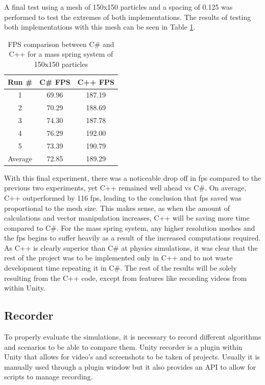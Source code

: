\documentclass[12pt,a4paper]{article}
\begin{document}
A final test using a mesh of 150x150 particles and a spacing of 0.125 was performed to test the extremes of both implementations. The results of testing both implementations with this mesh can be seen in Table \ref{tab:lang3}.\\
\begin{table}[htbp]
	\centering
	\begin{tabular}{|c|c|c|} %
		\hline %
		Run \# & C\# FPS & C++ FPS \\ %
		\hline %
		1 & 69.96 & 187.19 \\ 
		2 & 70.29 & 188.69 \\ 
		3 & 74.30 & 187.78 \\ 
		4 & 76.29 & 192.00  \\ 
		5 & 73.39 & 190.79  \\ 
		\hline
		Average & 72.85 & 189.29 \\ 
		\hline %
	\end{tabular}
	\caption{FPS comparison between C\# and C++ for a mass spring system of 150x150 particles} %
	\label{tab:lang3}
\end{table}

With this final experiment, there was a noticeable drop off in fps compared to the previous two experiments, yet C++ remained well ahead vs C\#. On average, C++ outperformed by 116 fps, leading to the conclusion that fps saved was proportional to the mesh size. This makes sense, as when the amount of calculations and vector manipulation increases, C++ will be saving more time compared to C\#. For the mass spring system, any higher resolution meshes and the fps begins to suffer heavily as a result of the increased computations required.\\

As C++ is clearly superior than C\# at physics simulations, it was clear that the rest of the project was to be implemented only in C++ and to not waste development time repeating it in C\#. The rest of the results will be solely resulting from the C++ code, except from features like recording videos from within Unity.
\subsection{Recorder}
To properly evaluate the simulations, it is necessary to record different algorithms and scenarios to be able to compare them. Unity recorder is a plugin within Unity that allows for video's and screenshots to be taken of projects. Usually it is manually used through a plugin window but it also provides an API to allow for scripts to manage recording. \\
\end{document}

